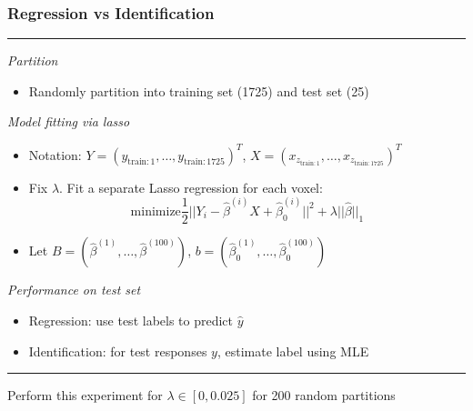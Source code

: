 \documentclass{beamer}
\begin{document}
\begin{frame}
\frametitle{Regression vs Identification}
\noindent\rule[0.5ex]{\linewidth}{0.5pt}
\emph{Partition}
\begin{itemize}
\item Randomly partition into training set (1725) and test set (25)
\end{itemize}
\emph{Model fitting via lasso}
\begin{itemize}
\item Notation: $Y = (y_{\text{train}: 1},\hdots, y_{\text{train}:1725})^T$, $X = (x_{z_{\text{train}: 1}},\hdots, x_{z_{\text{train}:1725}})^T$
\item Fix $\lambda$.  Fit a separate Lasso regression for each voxel:
\[
\text{minimize} \frac{1}{2}||Y_i - \hat{\beta}^{(i)} X + \hat{\beta}_0^{(i)}||^2 + \lambda ||\hat{\beta}||_1
\]
\item Let $B = (\hat{\beta}^{(1)},\hdots, \hat{\beta}^{(100)})$, $b = (\hat{\beta}_0^{(1)},\hdots, \hat{\beta}_0^{(100)})$
\end{itemize}
\emph{Performance on test set}
\begin{itemize}
\item Regression: use test labels to predict $\hat{y}$
\item Identification: for test responses $y$, estimate label using MLE
\end{itemize}
\noindent\rule[0.5ex]{\linewidth}{0.5pt}
\vspace{0.1in}
Perform this experiment for $\lambda \in [0, 0.025]$ for 200 random partitions
\end{frame}
\end{document}
